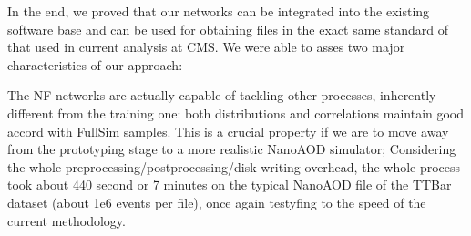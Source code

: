 In the end, we proved that our networks can be integrated into the existing software base and can be used for obtaining files in the exact same standard of that used in current analysis at CMS. We were able to asses two major characteristics of our approach:

\begin{outline}
    \1 The NF networks are actually capable of tackling other processes, inherently different from the training one: both distributions and correlations maintain good accord with FullSim samples. This is a crucial property if we are to move away from the prototyping stage to a more realistic NanoAOD simulator;
    \1 Considering the whole preprocessing/postprocessing/disk writing overhead, the whole process took about 440 second or 7 minutes on the typical NanoAOD file of the TTBar dataset (about 1e6 events per file), once again testyfing to the speed of the current methodology.
\end{outline}